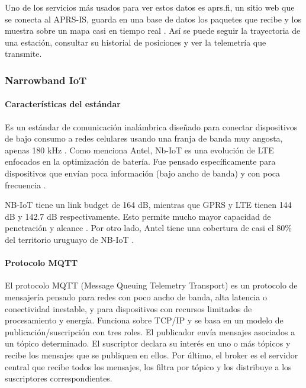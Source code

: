 \documentclass[12pt,a4paper]{article}
\begin{document}
Uno de los servicios más usados para ver estos datos es aprs.fi, un sitio web que se conecta al APRS-IS, guarda en una base de datos los paquetes que recibe y los muestra sobre un mapa casi en tiempo real \cite{ref112}. Así se puede seguir la trayectoria de una estación, consultar su historial de posiciones y ver la telemetría que transmite.

\subsubsection{Narrowband IoT}\label{narrowband-iot}

\paragraph{Características del estándar}\label{nbiot-caracteristicas}

Es un estándar de comunicación inalámbrica diseñado para conectar dispositivos de bajo consumo a redes celulares usando una franja de banda muy angosta, apenas 180 kHz \cite{ref67}. Como menciona Antel, Nb-IoT es una evolución de LTE enfocados en la optimización de batería. Fue pensado específicamente para dispositivos que envían poca información (bajo ancho de banda) y con poca frecuencia \cite{ref68}.

NB-IoT tiene un link budget de 164 dB, mientras que GPRS y LTE tienen 144 dB y 142.7 dB respectivamente. Esto permite mucho mayor capacidad de penetración y alcance \cite{ref69}. Por otro lado, Antel tiene una cobertura de casi el 80\% del territorio uruguayo de NB-IoT \cite{ref68}.

\paragraph{Protocolo MQTT}\label{nbiot-conexion-mqtt}

El protocolo MQTT (Message Queuing Telemetry Transport) es un protocolo de mensajería pensado para redes con poco ancho de banda, alta latencia o conectividad inestable, y para dispositivos con recursos limitados de procesamiento y energía. Funciona sobre TCP/IP y se basa en un modelo de publicación/suscripción con tres roles. El publicador envía mensajes asociados a un tópico determinado. El suscriptor declara su interés en uno o más tópicos y recibe los mensajes que se publiquen en ellos. Por último, el broker es el servidor central que recibe todos los mensajes, los filtra por tópico y los distribuye a los suscriptores correspondientes.
\end{document}
